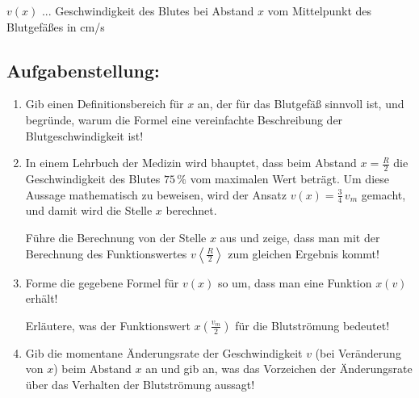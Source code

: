 \begin{langesbeispiel}
$v(x)$ ... Geschwindigkeit des Blutes bei Abstand $x$ vom Mittelpunkt des Blutgefäßes in cm/s

\subsection{Aufgabenstellung:}
\begin{enumerate}
	\item Gib einen Definitionsbereich für $x$ an, der für das Blutgefäß sinnvoll ist, und begründe, warum die Formel eine vereinfachte Beschreibung der Blutgeschwindigkeit ist!
	
	\item In einem Lehrbuch der Medizin wird bhauptet, dass beim Abstand $x=\frac{R}{2}$ die Geschwindigkeit des Blutes $75\,\%$ vom maximalen Wert beträgt. Um diese Aussage mathematisch zu beweisen, wird der Ansatz $v(x)=\frac{3}{4}\,v_m$ gemacht, und damit wird die Stelle $x$ berechnet.
	
	Führe die Berechnung von der Stelle $x$ aus und zeige, dass man mit der Berechnung des Funktionswertes $v\left\langle \frac{R}{2}\right\rangle$ zum gleichen Ergebnis kommt!
	
	\item Forme die gegebene Formel für $v(x)$ so um, dass man eine Funktion $x(v)$ erhält!
	
	Erläutere, was der Funktionswert $x\left(\frac{v_m}{2}\right)$ für die Blutströmung bedeutet!
	
	\item Gib die momentane Änderungsrate der Geschwindigkeit $v$ (bei Veränderung von $x$) beim Abstand $x$ an und gib an, was das Vorzeichen der Änderungsrate über das Verhalten der Blutströmung aussagt!
	
						\end{enumerate}\leer
				
\end{langesbeispiel}
